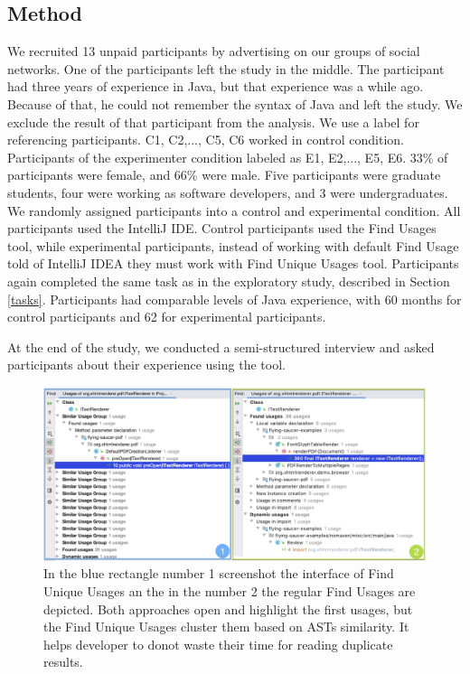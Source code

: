 \documentclass[conference]{IEEEtran}
\begin{document}
\subsection{Method}

We recruited 13 unpaid participants by advertising on our groups of social networks. One of the participants left the study in the middle. The participant had three years of experience in Java, but that experience was a while ago. Because of that, he could not remember the syntax of Java and left the study. We exclude the result of that participant from the analysis. We use a label for referencing participants. C1, C2,..., C5, C6 worked in control condition.  Participants of the experimenter condition labeled as E1, E2,..., E5, E6. 33\% of participants were female, and 66\% were male. Five participants were graduate students, four were working as software developers, and 3 were undergraduates. We randomly assigned participants into a control and experimental condition. All participants used the IntelliJ IDE. Control participants used the Find Usages tool, while experimental participants, instead of working with default Find Usage told of IntelliJ IDEA they must work with Find Unique Usages tool. 
Participants again completed the same task as in the exploratory study, described in Section \ref{tasks}. Participants had comparable levels of Java experience, with 60 months for control participants and 62 for experimental participants.\par 
At the end of the study, we conducted a semi-structured interview and asked participants about their experience using the tool.

\begin{figure}[h]
    \centering
    \includegraphics [width=\textwidth,keepaspectratio,clip]{figures/compare}
    \caption{In the blue rectangle number 1 screenshot the interface of Find Unique Usages an the in the number 2 the regular Find Usages are depicted. Both approaches open and highlight the first usages, but the Find Unique Usages cluster them based on ASTs similarity. It helps developer to donot waste their time for reading duplicate results.  }
\label{fig:compare}
\end{figure}
\end{document}

